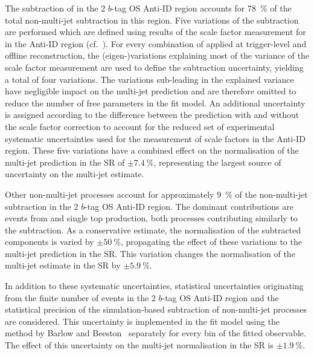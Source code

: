 The subtraction of \ttbarFakes in the 2 $b$-tag OS Anti-ID region accounts for
\SI{78}{\percent} of the total non-multi-jet subtraction in this region. Five
variations of the subtraction are performed which are defined using results of
the scale factor measurement for \ttbarFakes in the Anti-ID region (cf.\
). %
For every combination of \tauid applied at trigger-level and offline \tauhadvis
reconstruction, the (eigen-)variations explaining most of the variance of the
scale factor measurement are used to define the \ttbarFakes subtraction
uncertainty, yielding a total of four variations. The variations sub-leading in
the explained variance have negligible impact on the multi-jet prediction and
are therefore omitted to reduce the number of free parameters in the fit
model. An additional uncertainty is assigned according to the difference between
the \ttbarFakes prediction with and without the scale factor correction to
account for the reduced set of experimental systematic uncertainties used for
the measurement of \ttbarFakes scale factors in the Anti-ID region. These five
variations have a combined effect on the normalisation of the multi-jet
prediction in the SR of $\pm\SI{7.4}{\percent}$, representing the largest source
of uncertainty on the multi-jet estimate.

Other non-multi-jet processes account for approximately \SI{9}{\percent} of the
non-multi-jet subtraction in the 2 $b$-tag OS Anti-ID region. The dominant
contributions are events from \Vjets and single top production, both processes
contributing similarly to the subtraction. As a conservative estimate, the
normalisation of the subtracted components is varied by $\pm \SI{50}{\percent}$,
propagating the effect of these variations to the multi-jet prediction in the
SR. This variation changes the normalisation of the multi-jet estimate in the SR
by $\pm\SI{5.9}{\percent}$.

In addition to these systematic uncertainties, statistical uncertainties
originating from the finite number of events in the 2 $b$-tag OS Anti-ID region
and the statistical precision of the simulation-based subtraction of
non-multi-jet processes are considered. This uncertainty is implemented in the
fit model using the method by Barlow and Beeston~\cite{barlow1993,conway2011}
separately for every bin of the fitted observable. The effect of this
uncertainty on the multi-jet normalisation in the SR is
$\pm \SI{1.9}{\percent}$.

